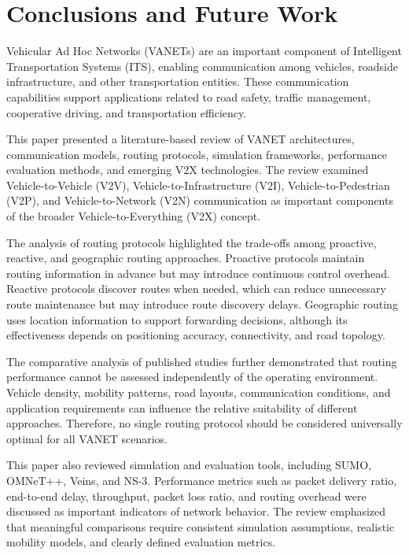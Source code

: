 
\section{Conclusions and Future Work}
\label{sec:5}

Vehicular Ad Hoc Networks (VANETs) are an
important component of Intelligent
Transportation Systems (ITS), enabling
communication among vehicles, roadside
infrastructure, and other transportation
entities. These communication capabilities
support applications related to road safety,
traffic management, cooperative driving,
and transportation efficiency.

This paper presented a literature-based
review of VANET architectures, communication
models, routing protocols, simulation
frameworks, performance evaluation methods,
and emerging V2X technologies. The review
examined Vehicle-to-Vehicle (V2V),
Vehicle-to-Infrastructure (V2I),
Vehicle-to-Pedestrian (V2P), and
Vehicle-to-Network (V2N) communication
as important components of the broader
Vehicle-to-Everything (V2X) concept.

The analysis of routing protocols highlighted
the trade-offs among proactive, reactive,
and geographic routing approaches.
Proactive protocols maintain routing
information in advance but may introduce
continuous control overhead. Reactive
protocols discover routes when needed,
which can reduce unnecessary route
maintenance but may introduce route
discovery delays. Geographic routing
uses location information to support
forwarding decisions, although its
effectiveness depends on positioning
accuracy, connectivity, and road
topology.

The comparative analysis of published
studies further demonstrated that
routing performance cannot be assessed
independently of the operating
environment. Vehicle density, mobility
patterns, road layouts, communication
conditions, and application requirements
can influence the relative suitability
of different approaches. Therefore,
no single routing protocol should be
considered universally optimal for
all VANET scenarios.

This paper also reviewed simulation
and evaluation tools, including SUMO,
OMNeT++, Veins, and NS-3. Performance
metrics such as packet delivery ratio,
end-to-end delay, throughput, packet
loss ratio, and routing overhead were
discussed as important indicators of
network behavior. The review emphasized
that meaningful comparisons require
consistent simulation assumptions,
realistic mobility models, and clearly
defined evaluation metrics.

